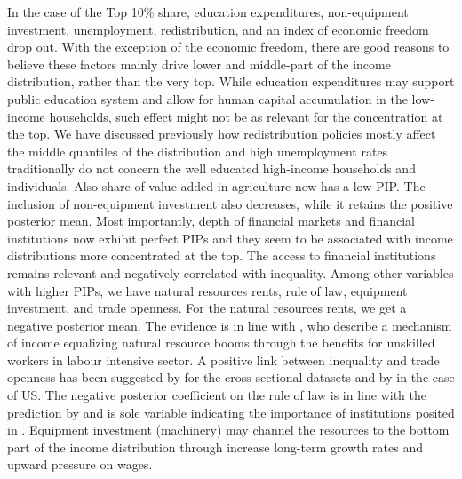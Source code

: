 \begin{refsection}
In the case of the Top 10\% share, education expenditures, non-equipment investment, unemployment, redistribution, and an index of economic freedom drop out. With the exception of the economic freedom, there are good reasons to believe these factors mainly drive lower and middle-part of the income distribution, rather than the very top. While education expenditures may support public education system and allow for human capital accumulation in the low-income households, such effect might not be as relevant for the concentration at the top. We have discussed previously how redistribution policies mostly affect the middle quantiles of the distribution and high unemployment rates traditionally do not concern the well educated high-income households and individuals. Also share of value added in agriculture now has a low \ac{PIP}. The inclusion of non-equipment investment also decreases, while it retains the positive posterior mean. Most importantly, depth of financial markets and financial institutions now exhibit perfect \acp{PIP} and they seem to be associated with income distributions more concentrated at the top. The access to financial institutions remains relevant and negatively correlated with inequality. Among other variables with higher \acp{PIP}, we have natural resources rents, rule of law, equipment investment, and trade openness. For the natural resources rents, we get a negative posterior mean. The evidence is in line with \textcite{goderismalone2011}, who describe a mechanism of income equalizing natural resource booms through the benefits for unskilled workers in labour intensive sector. A positive link between inequality and trade openness has been suggested by \textcite{Jaumotte2013,dabla2015causes} for the cross-sectional datasets and by \textcite{milanovicvan2018inequality} in the case of \ac{US}. The negative posterior coefficient on the rule of law is in line with the prediction by \textcite{perotti2007investor} and is sole variable indicating the importance of institutions posited in \textcite{acemoglu2003cross,acemoglu2015rise}. Equipment investment (machinery) may channel the resources to the bottom part of the income distribution through increase long-term growth rates and upward pressure on wages.


\end{refsection}
